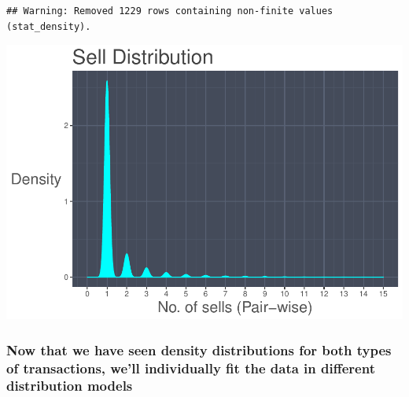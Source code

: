 \documentclass[]{article}
\newenvironment{Shaded}{\begin{snugshade}}{\end{snugshade}}
\newcommand{\KeywordTok}[1]{\textcolor[rgb]{0.13,0.29,0.53}{\textbf{#1}}}
\newcommand{\StringTok}[1]{\textcolor[rgb]{0.31,0.60,0.02}{#1}}
\newcommand{\OperatorTok}[1]{\textcolor[rgb]{0.81,0.36,0.00}{\textbf{#1}}}
\newcommand{\NormalTok}[1]{#1}
\begin{document}
\begin{verbatim}
## Warning: Removed 1229 rows containing non-finite values (stat_density).
\end{verbatim}

\includegraphics{analysis_files/figure-latex/unnamed-chunk-11-1.pdf}

\subsubsection{Now that we have seen density distributions for both
types of transactions, we'll individually fit the data in different
distribution
models}\label{now-that-we-have-seen-density-distributions-for-both-types-of-transactions-well-individually-fit-the-data-in-different-distribution-models}

\begin{Shaded}
\end{Shaded}
\end{document}
